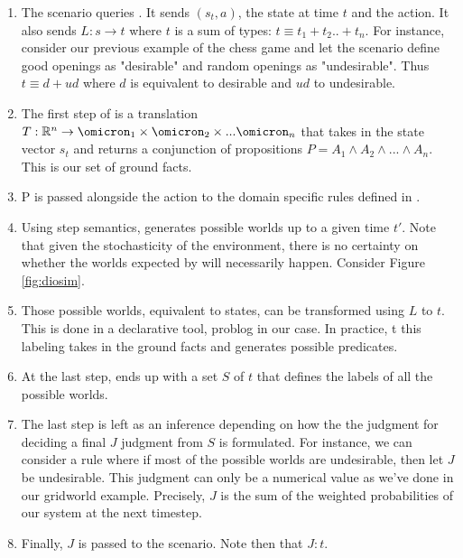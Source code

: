 \begin{enumerate}
  \item The scenario queries \dio. It sends $(s_t, a)$, the state at time $t$ and the action. It also sends $L : s \rightarrow t$ where $t$ is a sum of types: 
        $t \equiv t_1 + t_2 .. + t_n$. For instance, consider our previous example of the chess game and let the scenario define good openings as "desirable" and random openings as 
        "undesirable". Thus $t \equiv d + ud$ where $d$ is equivalent to desirable and $ud$ to undesirable. 
  \item The first step of \dio is a translation $T : \mathbb{R}^n
  \rightarrow \omicron_1 \times \omicron_2 \times ... \omicron_n$ that takes in the state
  vector $s_t$ and returns a conjunction of propositions $P = A_1 \wedge
  A_2 \wedge ... \wedge A_n$. This is our set of ground facts.
  \item P is passed alongside the action to the domain specific rules defined in \dio. 
  \item Using step semantics, \dio generates possible worlds up to a given time $t'$. Note that given the stochasticity of the environment, there is no certainty on
        whether the worlds expected by \dio will necessarily happen. Consider Figure \ref{fig:diosim}.
  \item Those possible worlds, equivalent to states, can be
  transformed using $L$ to $t$. This is done in a declarative tool, problog in our case. In practice, t
  this labeling takes in the ground facts and generates possible predicates. 
  \item At the last step, \dio ends up with a set $S$ of $t$ that defines the labels of all the possible worlds.
  \item The last step is left as an inference depending on how the the judgment for deciding a final $J$ judgment from $S$ 
        is formulated. For instance, we can consider a rule where if most of the possible worlds are undesirable, then let $J$ be undesirable.
        This judgment can only be a numerical value as we've done in our gridworld example. Precisely, $J$ is the sum of the weighted probabilities of our system at the next 
        timestep.
  \item Finally, $J$ is passed to the scenario. Note then that $J : t$. 
\end{enumerate}

